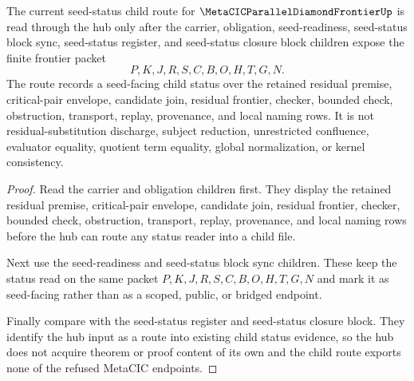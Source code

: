 \begin{theorem}
\label{thm:metacic-parallel-diamond-frontier-seed-status-child-route}
The current seed-status child route for $\MetaCICParallelDiamondFrontierUp$ is read through the hub only after the carrier, obligation, seed-readiness, seed-status block sync, seed-status register, and seed-status closure block children expose the finite frontier packet
$$
P,K,J,R,S,C,B,O,H,T,G,N .
$$
The route records a seed-facing child status over the retained residual premise, critical-pair envelope, candidate join, residual frontier, checker, bounded check, obstruction, transport, replay, provenance, and local naming rows. It is not residual-substitution discharge, subject reduction, unrestricted confluence, evaluator equality, quotient term equality, global normalization, or kernel consistency.
\end{theorem}
\begin{proof}
Read the carrier and obligation children first. They display the retained residual premise, critical-pair envelope, candidate join, residual frontier, checker, bounded check, obstruction, transport, replay, provenance, and local naming rows before the hub can route any status reader into a child file.

Next use the seed-readiness and seed-status block sync children. These keep the status read on the same packet $P,K,J,R,S,C,B,O,H,T,G,N$ and mark it as seed-facing rather than as a scoped, public, or bridged endpoint.

Finally compare with the seed-status register and seed-status closure block. They identify the hub input as a route into existing child status evidence, so the hub does not acquire theorem or proof content of its own and the child route exports none of the refused MetaCIC endpoints.
\end{proof}
